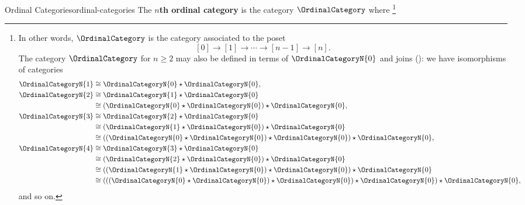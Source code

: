 \begin{example}{Ordinal Categories}{ordinal-categories}%
    The \textbf{$n$th ordinal category} is the category $\OrdinalCategory$ where%
    \footnote{%
        In other words, $\OrdinalCategory$ is the category associated to the poset
        \[%
            [0]\to[1]\to\cdots\to[n-1]\to[n].%
        \]%
        The category $\OrdinalCategory$ for $n\geq2$ may also be defined in terms of $\OrdinalCategoryN{0}$ and joins (): we have isomorphisms of categories
        \begin{align*}
            \OrdinalCategoryN{1} &\cong \OrdinalCategoryN{0}\star\OrdinalCategoryN{0},\\
            \OrdinalCategoryN{2} &\cong \OrdinalCategoryN{1}\star\OrdinalCategoryN{0}\\
                                 &\cong (\OrdinalCategoryN{0}\star\OrdinalCategoryN{0})\star\OrdinalCategoryN{0},\\
            \OrdinalCategoryN{3} &\cong \OrdinalCategoryN{2}\star\OrdinalCategoryN{0}\\
                                 &\cong (\OrdinalCategoryN{1}\star\OrdinalCategoryN{0})\star\OrdinalCategoryN{0}\\
                                 &\cong ((\OrdinalCategoryN{0}\star\OrdinalCategoryN{0})\star\OrdinalCategoryN{0})\star\OrdinalCategoryN{0},\\
            \OrdinalCategoryN{4} &\cong \OrdinalCategoryN{3}\star\OrdinalCategoryN{0}\\
                                 &\cong (\OrdinalCategoryN{2}\star\OrdinalCategoryN{0})\star\OrdinalCategoryN{0}\\
                                 &\cong ((\OrdinalCategoryN{1}\star\OrdinalCategoryN{0})\star\OrdinalCategoryN{0})\star\OrdinalCategoryN{0}\\
                                 &\cong (((\OrdinalCategoryN{0}\star\OrdinalCategoryN{0})\star\OrdinalCategoryN{0})\star\OrdinalCategoryN{0})\star\OrdinalCategoryN{0},
        \end{align*}
        and so on.
        \par\vspace*{-2.25\baselineskip}
    }%
    \begin{itemize}

\end{itemize}
\end{example}
